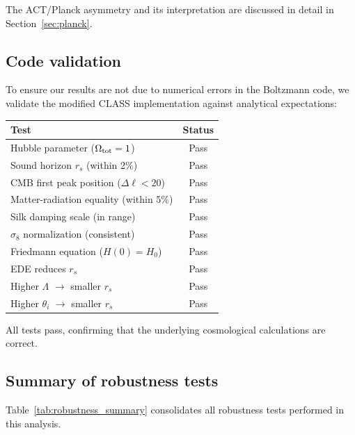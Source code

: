 \documentclass[twocolumn,showpacs,preprintnumbers,amsmath,amssymb,prd]{revtex4-2}
\begin{document}
The ACT/Planck asymmetry and its interpretation are discussed in detail 
in Section~\ref{sec:planck}.

\subsection{Code validation}

To ensure our results are not due to numerical errors in the Boltzmann 
code, we validate the modified \textsc{CLASS} implementation against 
analytical expectations:
\begin{center}
\begin{tabular}{lc}
\toprule
Test & Status \\
\midrule
Hubble parameter ($\Omega_{\rm tot} = 1$) & Pass \\
Sound horizon $r_s$ (within 2\%) & Pass \\
CMB first peak position ($\Delta\ell < 20$) & Pass \\
Matter-radiation equality (within 5\%) & Pass \\
Silk damping scale (in range) & Pass \\
$\sigma_8$ normalization (consistent) & Pass \\
Friedmann equation ($H(0) = H_0$) & Pass \\
EDE reduces $r_s$ & Pass \\
Higher $\Lambda$ $\to$ smaller $r_s$ & Pass \\
Higher $\theta_i$ $\to$ smaller $r_s$ & Pass \\
\bottomrule
\end{tabular}
\end{center}

All tests pass, confirming that the underlying cosmological calculations 
are correct.

\subsection{Summary of robustness tests}

Table~\ref{tab:robustness_summary} consolidates all robustness tests 
performed in this analysis.
\end{document}
